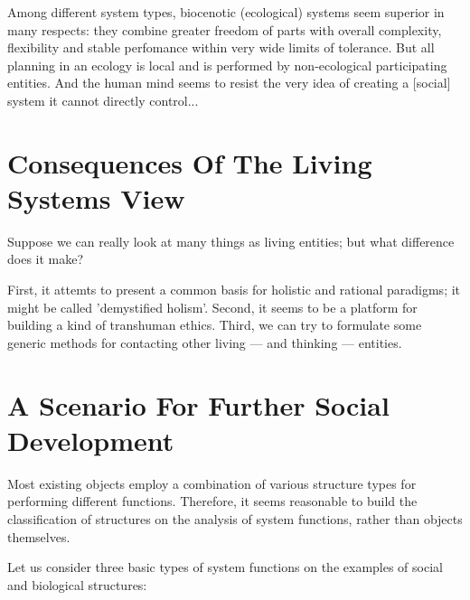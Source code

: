      Among different system  types,  biocenotic  (ecological)  systems
seem superior in many respects:  they combine greater freedom of parts
with overall complexity, flexibility and stable perfomance within very
wide limits of tolerance.  But all planning in an ecology is local and
is performed by non-ecological participating entities.  And the  human
mind  seems  to  resist the very idea of creating a [social] system it
cannot directly control...



\section{Consequences Of The Living Systems View}

     Suppose we can really look at many things as living entities; but
what difference does it make?


     First, it attemts to present a  common  basis  for  holistic  and
rational  paradigms; it might be called 'demystified holism'.  Second,
it seems to be a platform for building a kind  of  transhuman  ethics.
Third,  we  can  try  to formulate some generic methods for contacting
other living --- and thinking --- entities.



\section{A Scenario For Further Social Development}

     Most existing objects employ a combination of  various  structure
types   for  performing  different  functions.   Therefore,  it  seems
reasonable to build the classification of structures on  the  analysis
of system functions, rather than objects themselves.

     Let us consider three basic types  of  system  functions  on  the
examples of social and biological structures:


